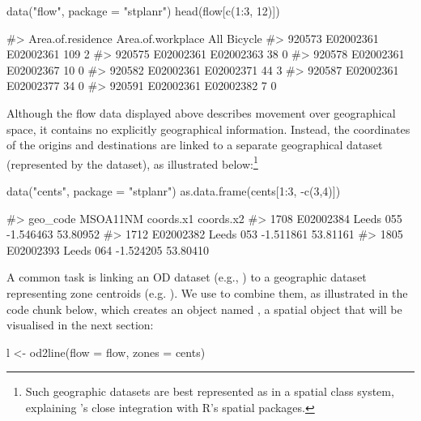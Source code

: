 \begin{Schunk}
\begin{Sinput}
data("flow", package = "stplanr")
head(flow[c(1:3, 12)])
\end{Sinput}
\begin{Soutput}
#>        Area.of.residence Area.of.workplace All Bicycle
#> 920573         E02002361         E02002361 109       2
#> 920575         E02002361         E02002363  38       0
#> 920578         E02002361         E02002367  10       0
#> 920582         E02002361         E02002371  44       3
#> 920587         E02002361         E02002377  34       0
#> 920591         E02002361         E02002382   7       0
\end{Soutput}
\end{Schunk}

Although the flow data displayed above describes movement over
geographical space, it contains no explicitly geographical information.
Instead, the coordinates of the origins and destinations are linked to a
separate geographical dataset (represented by the  dataset),
as illustrated below:\footnote{Such geographic datasets are best represented as in a spatial class system, explaining
's close integration with R's spatial packages.}


\begin{Schunk}
\begin{Sinput}
data("cents", package = "stplanr")
as.data.frame(cents[1:3, -c(3,4)])
\end{Sinput}
\begin{Soutput}
#>       geo_code  MSOA11NM coords.x1 coords.x2
#> 1708 E02002384 Leeds 055 -1.546463  53.80952
#> 1712 E02002382 Leeds 053 -1.511861  53.81161
#> 1805 E02002393 Leeds 064 -1.524205  53.80410
\end{Soutput}
\end{Schunk}

A common task is linking an OD dataset (e.g., ) to a geographic dataset
representing zone centroids (e.g. ).
We use  to combine them, as illustrated in the code chunk below,
which creates an object named , a spatial object that will be visualised
in the next section:

\begin{Schunk}
\begin{Sinput}
l <- od2line(flow = flow, zones = cents)
\end{Sinput}
\end{Schunk}

